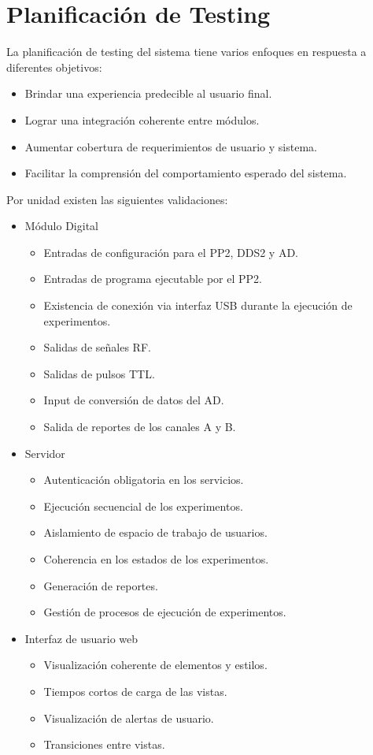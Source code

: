 \section{Planificaci\'on de Testing}

La planificaci\'on de testing del sistema tiene varios enfoques en respuesta a diferentes objetivos:
\begin{itemize}
    \item Brindar una experiencia predecible al usuario final.
    \item Lograr una integraci\'on coherente entre m\'odulos.
    \item Aumentar cobertura de requerimientos de usuario y sistema.
    \item Facilitar la comprensi\'on del comportamiento esperado del sistema.
\end{itemize}
Por unidad existen las siguientes validaciones:
\begin{itemize}
    \item M\'odulo Digital
    \begin{itemize}
        \item Entradas de configuraci\'on para el PP2, DDS2 y AD.
        \item Entradas de programa ejecutable por el PP2.
        \item Existencia de conexi\'on via interfaz USB durante la ejecuci\'on de experimentos.
        \item Salidas de señales RF.
        \item Salidas de pulsos TTL.
        \item Input de conversi\'on de datos del AD.
        \item Salida de reportes de los canales A y B.
    \end{itemize}
    \item Servidor
    \begin{itemize}
        \item Autenticaci\'on obligatoria en los servicios.
        \item Ejecuci\'on secuencial de los experimentos.
        \item Aislamiento de espacio de trabajo de usuarios.
        \item Coherencia en los estados de los experimentos.
        \item Generaci\'on de reportes.
        \item Gesti\'on de procesos de ejecuci\'on de experimentos.
    \end{itemize}
    \item Interfaz de usuario web
    \begin{itemize}
        \item Visualizaci\'on coherente de elementos y estilos.
        \item Tiempos cortos de carga de las vistas.
        \item Visualizaci\'on de alertas de usuario.
        \item Transiciones entre vistas.
    \end{itemize}
\end{itemize}
